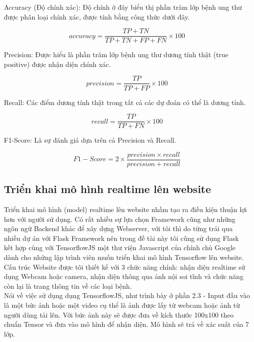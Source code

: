 \documentclass[12pt,a4paper]{article}
\begin{document}
	\noindent
	Accuracy (Độ chính xác): Độ chính ở đây biểu thị phần trăm lớp bệnh ung thư được phân loại chính xác, được tính bằng công thức dưới đây.
	
	\begin{equation}
		accuracy = \frac{TP + TN}{TP + TN + FP + FN}\times 100
	\end{equation}

	\noindent
	Precision: Được hiểu là phần trăm lớp bệnh ung thư dương tính thật (true positive) được nhận diện chính xác.
	
	\begin{equation}
		precision = \frac{TP}{TP + FP}\times 100
	\end{equation}

	\noindent
	Recall: Các điểm dương tính thật trong tất cả các dự đoán có thể là dương tính.
	
	\begin{equation}
		recall = \frac{TP}{TP + FN}\times 100
	\end{equation}

	\noindent
	F1-Score: Là sự đánh giá dựa trên cả Precision và Recall.
	
	\begin{equation}
		F1-Score = 2\times\frac{precision\times recall}{precision + recall}
	\end{equation}
	
	\subsection{Triển khai mô hình realtime lên website}
	Triển khai mô hình (model) realtime lên website nhầm tạo ra điều kiện thuận lợi hơn với người sử dụng. Có rất nhiều sự lựa chọn Framework cũng như những ngôn ngữ Backend khác để xây dựng Webserver, với tôi thì do từng trải qua nhiều dự án với Flask Framework nên trong đề tài này tôi cũng sử dụng Flask kết hợp cùng với TensorflowJS một thư viện Javascript của chính chủ Google dành cho những lập trình viên muốn triển khai mô hình Tensorflow lên website.\\
	
	\noindent
	Cấu trúc Website được tôi thiết kế với 3 chức năng chính: nhận diện realtime sử dụng Webcam hoặc camera, nhận diện thông qua ảnh nội soi tĩnh và chức năng còn lại là trang thông tin về các loại bệnh.\\
	
	\noindent
	Nói về việc sử dụng dụng TensorflowJS, như trình bày ở phần 2.3 - Input đầu vào là một bức ảnh hoặc một video cụ thể là ảnh được lấy từ webcam hoặc ảnh từ người dùng tải lên. Với bức ảnh này sẽ được đưa về kích thước 100x100 theo chuẩn Tensor và đưa vào mô hình để nhận diện. Mô hình sẽ trả về xác suất của 7 lớp.
	
\end{document}
